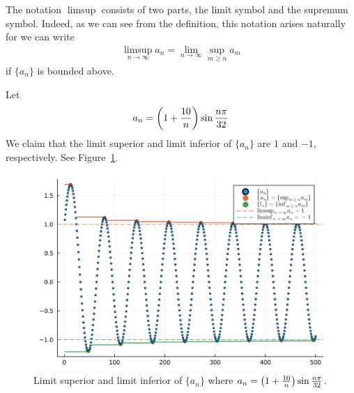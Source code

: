 \documentclass[thmcnt=section, 12pt]{my-elegantbook}
\begin{document}
\begin{note}
    The notation $\limsup$ consists of two parts, the limit symbol and the supremum symbol. Indeed, as we can see from the definition, this notation arises naturally for we can write
    \begin{align*}
        \limsup_{n \to \infty} a_n
        = \lim_{n \to \infty} \sup_{m \geq n} a_m
    \end{align*}
    if $\{a_n\}$ is bounded above.
\end{note}

\begin{example}
    Let
    \begin{align*}
        a_n = \left( 1 + \frac{10}{n} \right) \sin \frac{n \pi}{32}
    \end{align*}
    We claim that the limit superior and limit inferior of $\{a_n\}$ are $1$ and $-1$, respectively. See Figure~\ref{fig:12}.

    \begin{figure}[ht]
        \centering
        \includegraphics[scale=0.2]{figures/limsup-liminf.png}
        \caption{Limit superior and limit inferior of $\{a_n\}$ where $a_n = \left( 1 + \frac{10}{n} \right) \sin \frac{n \pi}{32}$.}
        \label{fig:12}
    \end{figure}


\end{example}
\end{document}
